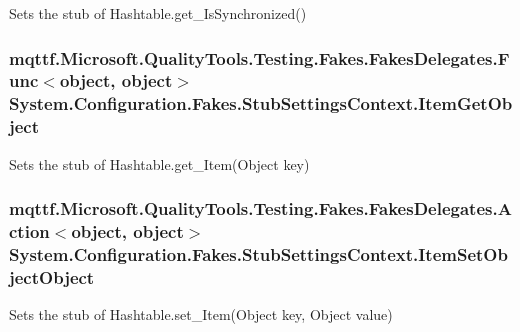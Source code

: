 Sets the stub of Hashtable.\-get\-\_\-\-Is\-Synchronized()

\hypertarget{class_system_1_1_configuration_1_1_fakes_1_1_stub_settings_context_ab3a9d1ebf2fe1d2daa3fe970bbb20f65}{
\subsubsection[{Item\-Get\-Object}]{\setlength{\rightskip}{0pt plus 5cm}mqttf.\-Microsoft.\-Quality\-Tools.\-Testing.\-Fakes.\-Fakes\-Delegates.\-Func$<$object, object$>$ System.\-Configuration.\-Fakes.\-Stub\-Settings\-Context.\-Item\-Get\-Object}}\label{class_system_1_1_configuration_1_1_fakes_1_1_stub_settings_context_ab3a9d1ebf2fe1d2daa3fe970bbb20f65}


Sets the stub of Hashtable.\-get\-\_\-\-Item(\-Object key)

\hypertarget{class_system_1_1_configuration_1_1_fakes_1_1_stub_settings_context_af016382aca684ad44635bd83e73fde36}{
\subsubsection[{Item\-Set\-Object\-Object}]{\setlength{\rightskip}{0pt plus 5cm}mqttf.\-Microsoft.\-Quality\-Tools.\-Testing.\-Fakes.\-Fakes\-Delegates.\-Action$<$object, object$>$ System.\-Configuration.\-Fakes.\-Stub\-Settings\-Context.\-Item\-Set\-Object\-Object}}\label{class_system_1_1_configuration_1_1_fakes_1_1_stub_settings_context_af016382aca684ad44635bd83e73fde36}


Sets the stub of Hashtable.\-set\-\_\-\-Item(\-Object key, Object value)

